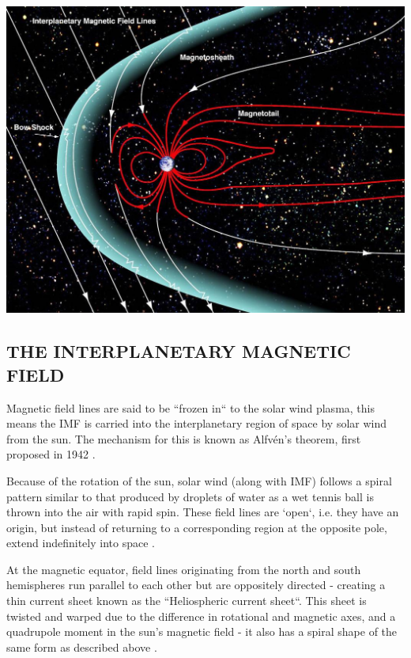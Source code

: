 \documentclass{article}
\newenvironment{Figure}
  {\par\medskip\noindent\minipage{\linewidth}}
  {\endminipage\par\medskip}
\begin{document}
\begin{multicols}{2}
\begin{Figure}
    \centering
    \includegraphics[width=0.8\linewidth]{NASA-Magnetosphere.jpeg}
    \label{fig:plasmasphere}
\end{Figure}

\subsection{THE INTERPLANETARY MAGNETIC FIELD}
Magnetic field lines are said to be ``frozen in`` to the solar wind plasma, this means the IMF is carried into the interplanetary region of space by solar wind from the sun. The mechanism for this is known as Alfvén's theorem, first proposed in 1942 \cite{alfven_1942}. 

Because of the rotation of the sun, solar wind (along with IMF) follows a spiral pattern similar to that produced by droplets of water as a wet tennis ball is thrown into the air with rapid spin. These field lines are `open`, i.e. they have an origin, but instead of returning to a corresponding region at the opposite pole, extend indefinitely into space \cite{imfUptoLat16}. 

At the magnetic equator, field lines originating from the north and south hemispheres run parallel to each other but are oppositely directed - creating a thin current sheet known as the ``Heliospheric current sheet``. This sheet is twisted and warped due to the difference in rotational and magnetic axes, and a quadrupole moment in the sun's magnetic field - it also has a spiral shape of the same form as described above \cite{alfven_1942, ParkerSpiral}.


\end{multicols}
\end{document}
